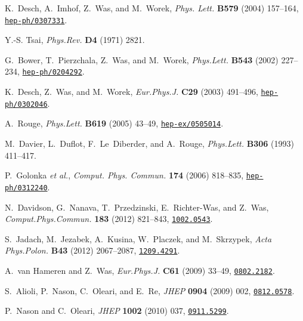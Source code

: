 \documentclass[12pt]{article}
\begin{document}
\begin{thebibliography}{10}
K.~Desch, A.~Imhof, Z.~Was, and M.~Worek, {\em Phys. Lett.} {\bf B579} (2004)
  157--164,
\href{http://www.arXiv.org/abs/hep-ph/0307331}{{\tt hep-ph/0307331}}.

Y.-S. Tsai, {\em Phys.Rev.} {\bf D4} (1971)
2821.

G.~Bower, T.~Pierzchala, Z.~Was, and M.~Worek, {\em Phys.Lett.} {\bf B543}
  (2002) 227--234,
\href{http://www.arXiv.org/abs/hep-ph/0204292}{{\tt hep-ph/0204292}}.

K.~Desch, Z.~Was, and M.~Worek, {\em Eur.Phys.J.} {\bf C29} (2003) 491--496,
\href{http://www.arXiv.org/abs/hep-ph/0302046}{{\tt hep-ph/0302046}}.

A.~Rouge, {\em Phys.Lett.} {\bf B619} (2005) 43--49,
\href{http://www.arXiv.org/abs/hep-ex/0505014}{{\tt hep-ex/0505014}}.

M.~Davier, L.~Duflot, F.~Le~Diberder, and A.~Rouge, {\em Phys.Lett.} {\bf B306}
  (1993)
411--417.

P.~Golonka {\em et al.}, {\em Comput. Phys. Commun.} {\bf 174} (2006) 818--835,
\href{http://www.arXiv.org/abs/hep-ph/0312240}{{\tt hep-ph/0312240}}.

N.~Davidson, G.~Nanava, T.~Przedzinski, E.~Richter-Was, and Z.~Was, {\em
  Comput.Phys.Commun.} {\bf 183} (2012) 821--843,
\href{http://www.arXiv.org/abs/1002.0543}{{\tt 1002.0543}}.

S.~Jadach, M.~Jezabek, A.~Kusina, W.~Placzek, and M.~Skrzypek, {\em Acta
  Phys.Polon.} {\bf B43} (2012) 2067--2087,
\href{http://www.arXiv.org/abs/1209.4291}{{\tt 1209.4291}}.

A.~van Hameren and Z.~Was, {\em Eur.Phys.J.} {\bf C61} (2009) 33--49,
\href{http://www.arXiv.org/abs/0802.2182}{{\tt 0802.2182}}.

S.~Alioli, P.~Nason, C.~Oleari, and E.~Re, {\em JHEP} {\bf 0904} (2009) 002,
\href{http://www.arXiv.org/abs/0812.0578}{{\tt 0812.0578}}.

P.~Nason and C.~Oleari, {\em JHEP} {\bf 1002} (2010) 037,
\href{http://www.arXiv.org/abs/0911.5299}{{\tt 0911.5299}}.


\end{thebibliography}
\end{document}
